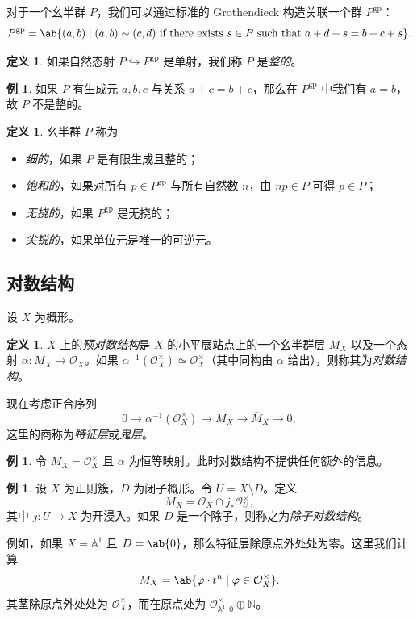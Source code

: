 \documentclass{amsart}
\theoremstyle{definition}
\newtheorem{defn}[thm]{定义}
\newtheorem{exm}[thm]{例}
\theoremstyle{remark}
\theoremstyle{plain}
\theoremstyle{definition}
\theoremstyle{remark}
\newcommand{\A}{\mathbb{A}}
\newcommand{\N}{\mathbb{N}}
\newcommand{\mc}[1]{\mathcal{#1}}
\newcommand{\mr}[1]{\mathrm{#1}}
\newcommand{\on}[1]{\operatorname{#1}}
\newcommand{\1}{\mathbf{1}}
\newcommand{\2}{\mathbf{2}}
\newcommand{\3}{\mathbf{3}}
\begin{document}
对于一个幺半群 \(P\)，我们可以通过标准的 Grothendieck 构造关联一个群 \(P^{\mr{gp}}\)：
\[ P^{\mr{gp}} = \ab\{(a,b) \mid (a,b) \sim (c,d) \text{ if there exists } s \in P \text{ such that } a+d+s = b+c+s \}. \]
\begin{defn}
如果自然态射 \(P \hookrightarrow P^{\mr{gp}}\) 是单射，我们称 \(P\) 是\textit{整的}。
\end{defn}

\begin{exm}
    如果 \(P\) 有生成元 \(a,b,c\) 与关系 \(a+c=b+c\)，那么在 \(P^{\on{gp}}\) 中我们有 \(a = b\)，故 \(P\) 不是整的。
\end{exm}

\begin{defn}
    幺半群 \(P\) 称为
    \begin{itemize}
        \item \textit{细的}，如果 \(P\) 是有限生成且整的；
        \item \textit{饱和的}，如果对所有 \(p \in P^{\mr{gp}}\) 与所有自然数 \(n\)，由 \(np \in P\) 可得 \(p \in P\)；
        \item \textit{无挠的}，如果 \(P^{\mr{gp}}\) 是无挠的；
        \item \textit{尖锐的}，如果单位元是唯一的可逆元。
    \end{itemize}
\end{defn}

\subsection{对数结构}%
\label{sub:Log structures}

设 \(X\) 为概形。
\begin{defn}
    \(X\) 上的\textit{预对数结构}是 \(X\) 的小平展站点上的一个幺半群层 \(M_X\) 以及一个态射 \(\alpha \colon M_X \to \mc{O}_X\)。如果 \(\alpha^{-1}(\mc{O}_X^{\times}) \simeq \mc{O}_X^{\times}\)（其中同构由 \(\alpha\) 给出），则称其为\textit{对数结构}。
\end{defn}

现在考虑正合序列
\[ 0 \to \alpha^{-1}(\mc{O}_X^{\times}) \to M_X \to \bar{M}_X \to 0, \]
这里的商称为\textit{特征层}或\textit{鬼层}。

\begin{exm}
    令 \(M_X = \mc{O}_X^{\times}\) 且 \(\alpha\) 为恒等映射。此时对数结构不提供任何额外的信息。
\end{exm}

\begin{exm}
    设 \(X\) 为正则簇，\(D\) 为闭子概形。令 \(U = X \setminus D\)。定义
    \[ M_X = \mc{O}_X \cap j_* \mc{O}_U^{\times}, \]
    其中 \(j \colon U \to X\) 为开浸入。如果 \(D\) 是一个除子，则称之为\textit{除子对数结构}。

    例如，如果 \(X = \A^1\) 且 \(D = \ab\{0\}\)，那么特征层除原点外处处为零。这里我们计算
    \[ M_X = \ab\{ \varphi \cdot t^n \mid \varphi \in \mc{O}_X^{\times} \}. \]
    其茎除原点外处处为 \(\mc{O}_X^{\times}\)，而在原点处为 \(\mc{O}_{\A^1, 0}^{\times} \oplus \N\)。
\end{exm}
\end{document}
